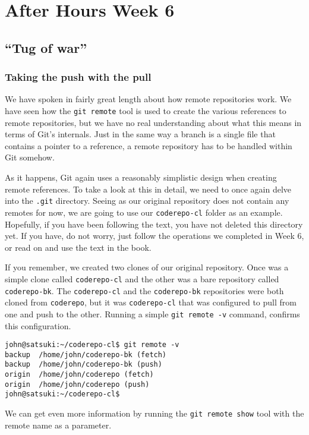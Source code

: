 \chapter{After Hours Week 6}
\section{``Tug of war''}
\subsection{Taking the push with the pull}

We have spoken in fairly great length about how remote repositories work.  We have seen how the \texttt{git remote} tool is used to create the various references to remote repositories, but we have no real understanding about what this means in terms of Git's internals.  Just in the same way a branch is a single file that contains a pointer to a reference, a remote repository has to be handled within Git somehow.

As it happens, Git again uses a reasonably simplistic design when creating remote references.  To take a look at this in detail, we need to once again delve into the \texttt{.git} directory.  Seeing as our original repository does not contain any remotes for now, we are going to use our \texttt{coderepo-cl} folder as an example.  Hopefully, if you have been following the text, you have not deleted this directory yet.  If you have, do not worry, just follow the operations we completed in Week 6, or read on and use the text in the book.

If you remember, we created two clones of our original repository.  Once was a simple clone called \texttt{coderepo-cl} and the other was a bare repository called \texttt{coderepo-bk}.  The \texttt{coderepo-cl} and the \texttt{coderepo-bk} repositories were both cloned from \texttt{coderepo}, but it was \texttt{coderepo-cl} that was configured to pull from one and push to the other.  Running a simple \texttt{git remote -v} command, confirms this configuration.

\begin{Verbatim}
john@satsuki:~/coderepo-cl$ git remote -v
backup	/home/john/coderepo-bk (fetch)
backup	/home/john/coderepo-bk (push)
origin	/home/john/coderepo (fetch)
origin	/home/john/coderepo (push)
john@satsuki:~/coderepo-cl$ 
\end{Verbatim}

We can get even more information by running the \texttt{git remote show} tool with the remote name as a parameter.


